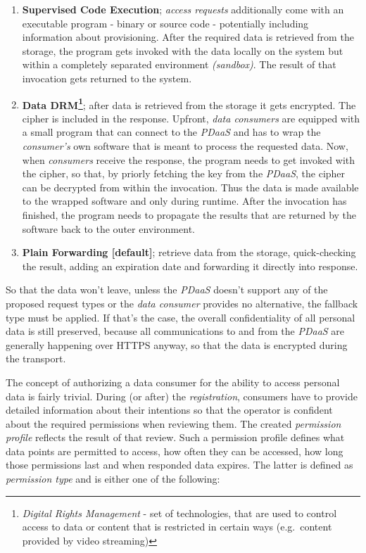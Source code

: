 \documentclass[12pt,english,a4paper,titlepage,cleardoublepage=empty,dottedtoc]{report}
\providecommand{\tightlist}{%
  \setlength{\itemsep}{0pt}\setlength{\parskip}{0pt}}
\begin{document}
\begin{enumerate}
\def\labelenumi{\alph{enumi})}
\tightlist
\item
  \textbf{Supervised Code Execution}; \emph{access requests}
  additionally come with an executable program - binary or source code -
  potentially including information about provisioning. After the
  required data is retrieved from the storage, the program gets invoked
  with the data locally on the system but within a completely separated
  environment \emph{(sandbox)}. The result of that invocation gets
  returned to the system.
\item
  \textbf{Data DRM\footnote{\emph{Digital Rights Management} - set of
    technologies, that are used to control access to data or content
    that is restricted in certain ways (e.g.~content provided by video
    streaming)}}; after data is retrieved from the storage it gets
  encrypted. The cipher is included in the response. Upfront, \emph{data
  consumers} are equipped with a small program that can connect to the
  \emph{PDaaS} and has to wrap the \emph{consumer's} own software that
  is meant to process the requested data. Now, when \emph{consumers}
  receive the response, the program needs to get invoked with the
  cipher, so that, by priorly fetching the key from the \emph{PDaaS},
  the cipher can be decrypted from within the invocation. Thus the data
  is made available to the wrapped software and only during runtime.
  After the invocation has finished, the program needs to propagate the
  results that are returned by the software back to the outer
  environment.
\item
  \textbf{Plain Forwarding {[}default{]}}; retrieve data from the
  storage, quick-checking the result, adding an expiration date and
  forwarding it directly into response.
\end{enumerate}

So that the data won't leave, unless the \emph{PDaaS} doesn't support
any of the proposed request types or the \emph{data consumer} provides
no alternative, the fallback type must be applied. If that's the case,
the overall confidentiality of all personal data is still preserved,
because all communications to and from the \emph{PDaaS} are generally
happening over HTTPS anyway, so that the data is encrypted during the
transport.

The concept of authorizing a data consumer for the ability to access
personal data is fairly trivial. During (or after) the
\emph{registration}, consumers have to provide detailed information
about their intentions so that the operator is confident about the
required permissions when reviewing them. The created \emph{permission
profile} reflects the result of that review. Such a permission profile
defines what data points are permitted to access, how often they can be
accessed, how long those permissions last and when responded data
expires. The latter is defined as \emph{permission type} and is either
one of the following:
\end{document}

